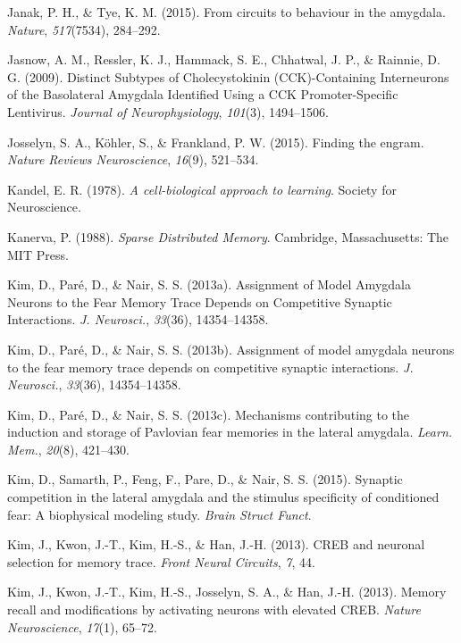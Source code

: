 \documentclass[12pt,a4paperpaper,]{report}
\begin{document}
\hypertarget{ref-janakux5fcircuitsux5f2015}{}
Janak, P. H., \& Tye, K. M. (2015). From circuits to behaviour in the
amygdala. \emph{Nature}, \emph{517}(7534), 284--292.

\hypertarget{ref-jasnowux5fdistinctux5f2009}{}
Jasnow, A. M., Ressler, K. J., Hammack, S. E., Chhatwal, J. P., \&
Rainnie, D. G. (2009). Distinct Subtypes of Cholecystokinin
(CCK)-Containing Interneurons of the Basolateral Amygdala Identified
Using a CCK Promoter-Specific Lentivirus. \emph{Journal of
Neurophysiology}, \emph{101}(3), 1494--1506.

\hypertarget{ref-josselynux5ffindingux5f2015}{}
Josselyn, S. A., Köhler, S., \& Frankland, P. W. (2015). Finding the
engram. \emph{Nature Reviews Neuroscience}, \emph{16}(9), 521--534.

\hypertarget{ref-kandelux5fcell-biologicalux5f1978}{}
Kandel, E. R. (1978). \emph{A cell-biological approach to learning}.
Society for Neuroscience.

\hypertarget{ref-kanervaux5fsparseux5f1988}{}
Kanerva, P. (1988). \emph{Sparse Distributed Memory}. Cambridge,
Massachusetts: The MIT Press.

\hypertarget{ref-kimux5fassignmentux5f2013-1}{}
Kim, D., Paré, D., \& Nair, S. S. (2013a). Assignment of Model Amygdala
Neurons to the Fear Memory Trace Depends on Competitive Synaptic
Interactions. \emph{J. Neurosci.}, \emph{33}(36), 14354--14358.

\hypertarget{ref-kimux5fassignmentux5f2013}{}
Kim, D., Paré, D., \& Nair, S. S. (2013b). Assignment of model amygdala
neurons to the fear memory trace depends on competitive synaptic
interactions. \emph{J. Neurosci.}, \emph{33}(36), 14354--14358.

\hypertarget{ref-kimux5fmechanismsux5f2013-1}{}
Kim, D., Paré, D., \& Nair, S. S. (2013c). Mechanisms contributing to
the induction and storage of Pavlovian fear memories in the lateral
amygdala. \emph{Learn. Mem.}, \emph{20}(8), 421--430.

\hypertarget{ref-kimux5fsynapticux5f2015}{}
Kim, D., Samarth, P., Feng, F., Pare, D., \& Nair, S. S. (2015).
Synaptic competition in the lateral amygdala and the stimulus
specificity of conditioned fear: A biophysical modeling study.
\emph{Brain Struct Funct}.

\hypertarget{ref-kimux5fcrebux5f2013}{}
Kim, J., Kwon, J.-T., Kim, H.-S., \& Han, J.-H. (2013). CREB and
neuronal selection for memory trace. \emph{Front Neural Circuits},
\emph{7}, 44.

\hypertarget{ref-kimux5fmemoryux5f2013}{}
Kim, J., Kwon, J.-T., Kim, H.-S., Josselyn, S. A., \& Han, J.-H. (2013).
Memory recall and modifications by activating neurons with elevated
CREB. \emph{Nature Neuroscience}, \emph{17}(1), 65--72.
\end{document}

